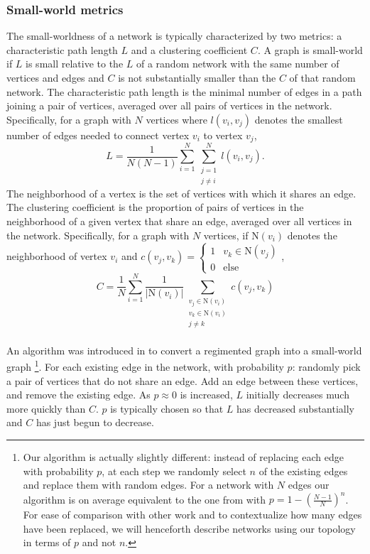 \documentclass{article}
\newcommand{\npar}{\\\indent}
\begin{document}
\subsubsection{Small-world metrics}
The small-worldness of a network is typically characterized by two metrics: a characteristic path length $L$ and a clustering coefficient $C$. A graph is small-world if $L$ is small relative to the $L$ of a random network with the same number of vertices and edges and $C$ is not substantially smaller than the $C$ of that random network. The characteristic path length is the minimal number of edges in a path joining a pair of vertices, averaged over all pairs of vertices in the network. Specifically, for a graph with $N$ vertices where $l(v_i,v_j)$ denotes the smallest number of edges needed to connect vertex $v_i$ to vertex $v_j$, 
\begin{equation}
\label{eqn:charpathlength}
L=\frac{1}{N(N-1)}\sum_{i=1}^{N}\sum_{\substack{j=1\\j\neq i}}^{N}l(v_i,v_j).
\end{equation}
The neighborhood of a vertex is the set of vertices with which it shares an edge. The clustering coefficient is the proportion of pairs of vertices in the neighborhood of a given vertex that share an edge, averaged over all vertices in the network. Specifically, for a graph with $N$ vertices, if $\text{N}(v_i)$ denotes the neighborhood of vertex $v_i$ and $c(v_j,v_k)=\begin{cases}1 & v_k\in\text{N}(v_j)\\0 & \text{else}\end{cases}$,
\begin{equation}
\label{eqn:clustcoeff}
C=\frac{1}{N}\sum_{i=1}^{N}\frac{1}{|\text{N}(v_i)|}\sum_{\substack{v_j\in \text{N}(v_i)\\v_k\in\text{N}(v_i)\\j\neq k}}c(v_j,v_k)
\end{equation}
\npar
An algorithm was introduced in \cite{watts98} to convert a regimented graph into a small-world graph
\footnote{Our algorithm is actually slightly different: instead of replacing each edge with probability $p$, at each step we randomly select $n$ of the existing edges and replace them with random edges. For a network with $N$ edges our algorithm is on average equivalent to the one from \cite{watts98} with $p=1-(\frac{N-1}{N})^n$. For ease of comparison with other work and to contextualize how many edges have been replaced, we will henceforth describe networks using our topology in terms of $p$ and not $n$.}.
 For each existing edge in the network, with probability $p$: randomly pick a pair of vertices that do not share an edge. Add an edge between these vertices, and remove the existing edge. As $p\approx 0$ is increased, $L$ initially decreases much more quickly than $C$. $p$ is typically chosen so that $L$ has decreased substantially and $C$ has just begun to decrease.
\end{document}
